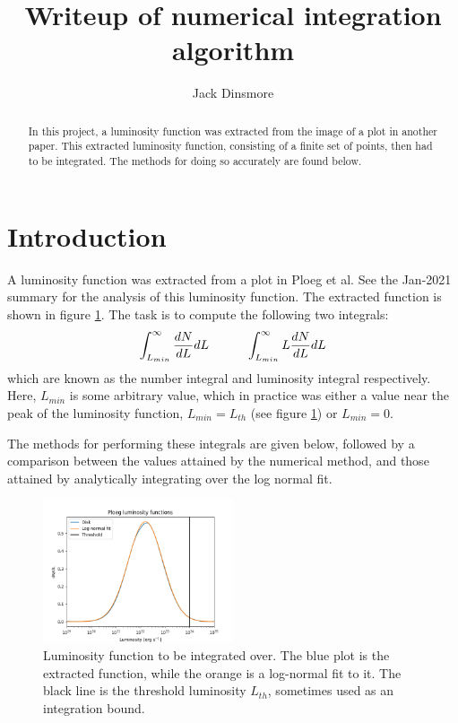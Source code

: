 \documentclass{C://Aliases//Dropbox-MIT//Latex_Templates//personal}
\author{Jack Dinsmore}
\title{Writeup of numerical integration algorithm}
\begin{document}
\maketitle

\begin{abstract}
In this project, a luminosity function was extracted from the image of a plot in another paper. This extracted luminosity function, consisting of a finite set of points, then had to be integrated. The methods for doing so accurately are found below.
\end{abstract}


\section{Introduction}
A luminosity function was extracted from a plot in Ploeg et al.\cite{ploeg} See the Jan-2021 summary for the analysis of this luminosity function. The extracted function is shown in figure \ref{fig:func}. The task is to compute the following two integrals:
\begin{equation}
    \int_{L_{min}}^\infty \frac{dN}{dL}dL \indent \indent \int_{L_{min}}^\infty L\frac{dN}{dL}dL
    \label{eqn:ints}
\end{equation}
which are known as the number integral and luminosity integral respectively. Here, $L_{min}$ is some arbitrary value, which in practice was either a value near the peak of the luminosity function, $L_{min} = L_{th}$ (see figure \ref{fig:func}) or $L_{min} = 0$.

The methods for performing these integrals are given below, followed by a comparison between the values attained by the numerical method, and those attained by analytically integrating over the log normal fit.

\begin{figure}[h]
    \centering
    \includegraphics[width=0.5\textwidth]{get-estimates.png}
    \caption{Luminosity function to be integrated over. The blue plot is the extracted function, while the orange is a log-normal fit to it. The black line is the threshold luminosity $L_{th}$, sometimes used as an integration bound.}
    \label{fig:func}
\end{figure}
\end{document}
